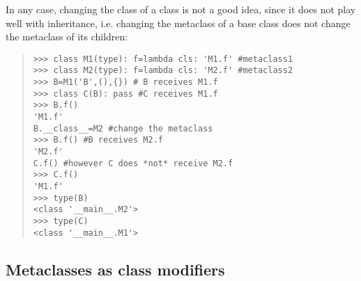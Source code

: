 \documentclass[10pt,english]{article}
\begin{document}
In any case, changing the class of a class is not a good idea, since it
does not play well with inheritance, i.e. changing the metaclass of a base 
class does not change the metaclass of its children:
\begin{quote}
\begin{verbatim}>>> class M1(type): f=lambda cls: 'M1.f' #metaclass1
>>> class M2(type): f=lambda cls: 'M2.f' #metaclass2
>>> B=M1('B',(),{}) # B receives M1.f
>>> class C(B): pass #C receives M1.f
>>> B.f()
'M1.f'
B.__class__=M2 #change the metaclass
>>> B.f() #B receives M2.f
'M2.f'
C.f() #however C does *not* receive M2.f
>>> C.f()
'M1.f'
>>> type(B)
<class '__main__.M2'>
>>> type(C)
<class '__main__.M1'>\end{verbatim}
\end{quote}



\hypertarget{metaclasses-as-class-modifiers}{}
\subsection*{Metaclasses as class modifiers}
\end{document}
